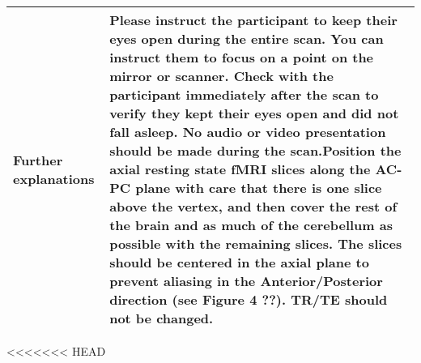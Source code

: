 \begin{tabularx}{\linewidth}{@{} s | X @{}}
Further explanations                              				& Please instruct the participant to keep their eyes open during the entire scan. You can instruct them to focus on a point on the mirror or scanner. Check with the participant immediately after the scan to verify they kept their eyes open and did not fall asleep. No audio or video presentation should be made during the scan.Position the axial resting state fMRI slices along the AC-PC plane with care that there is one slice above the vertex, and then cover the rest of the brain and as much of the cerebellum as possible with the remaining slices. The slices should be centered in the axial plane to prevent aliasing in the Anterior/Posterior direction (see Figure 4 ??). \ac{TR}/\ac{TE} should not be changed. \\
\bottomrule
\end{tabularx}

<<<<<<< HEAD
